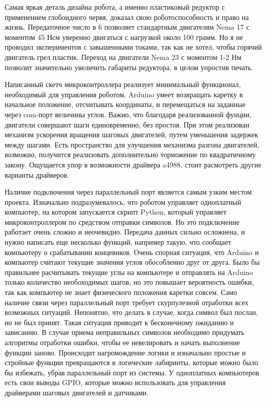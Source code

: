 Самая яркая деталь дизайна робота, а именно пластиковый редуктор с применением глобоидного червя, доказал свою роботоспособность и право на жизнь. Передаточное число в 6 позволяет стандартным двигателям Nema 17 с моментом 45 Нсм уверенно двигаться с нагрузкой около 100 грамм. Но я не проводил экспериментов с завышенными токами, так как не хотел, чтобы горячий двигатель грел пластик. Переход на двигатели Nema 23 с моментом 1-2 Нм позволит значительно увеличить габариты редуктора, в целом упростив печать.      

Написанный  скетч  микроконтроллера реализует минимальный функционал, необходимый для управления роботом. Arduino умеет возвращать каретку в начальное положение, отсчитывать координаты, и перемещаться на заданные через com-порт величины углов. Важно, что благодаря реализованной фунции, двигатели совершают шаги единовременно, без простоя. При этом реализован механизм ускорения вращения шаговых двигателей, путем уменьшения задержек между шагами. Есть пространство для улучшения механизма разгона двигателей, возможно, получится реализовать дополнительно торможение по квадратичному закону. Ощущается упор в возможности драйвера a4988, стоит расмотреть другие варианты драйверов.  

Наличие подключения через параллельный порт является самым узким местом проекта. Изначально подразумевалось, что роботом управляет одноплатный компьютер, на котором запускается скрипт Python, который управляет микроконтроллером по средством отправки символов. Но это подключение работает очень сложно и неочевидно. Передача данных сильно осложнена, и нужно написать еще несколько функций, например такую, что  сообщает компьютеру о срабатывании концевиков. Очень спорная ситуация, что Arduino и компьютер считают текущие значения углов обособленно друг от друга. Было бы правильнее расчитывать текущие углы на компьютере и отправлять на Arduino только количество необоходимых  шагов, но это повышает вероятность ошибки, так как компьютер не знает физического положения каретки совсем. Само наличие связи через параллельный порт требует скурпулезной отработки всех возможных ситуаций. Непонятно, что делать в случае, когда символ был послан, но не был принят. Такая ситуация приводит к бесконечному ожиданию и зависанию. В случае приема неправильных символов необходимо придумать алгоритмы отработки ошибки, чтобы ее невелировать и начать выполнение функции заново. Происходит нагромождение логики и изначально простые и стройные функции превращаются в логические лабиринты, которые можно было бы избежать, убрав параллельный порт из системы. У одноплатных компьютеров есть свои выводы GPIO, которые можно использовать для управления драйверами шаговых двигателей и датчиками.  

